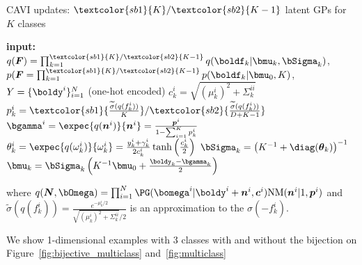 \begin{algorithm}[H]
    \caption{\ac{CAVI} updates: $\textcolor{sb1}{K}/\textcolor{sb2}{K - 1}$ latent \ac{GPs} for $K$ classes}
    \begin{algorithmic}
    \State \textbf{input:} $q(\boldsymbol{F}) = \prod_{k=1}^{\textcolor{sb1}{K}/\textcolor{sb2}{K - 1}} q(\boldf_k|\bmu_k, \bSigma_k)$, $p(\boldsymbol{F} = \prod_{k=1}^{\textcolor{sb1}{K}/\textcolor{sb2}{K - 1}} p(\boldf_k|\bmu_0, K)$, $Y=\{\boldy^i\}_{i=1}^N$ (one-hot encoded)
        \State $c^i_k = \sqrt{(\mu^i_k)^2 + \Sigma_k^{ii}}$
        \State $p^i_k = \textcolor{sb1}{\frac{\widetilde{\sigma}(q(f_k^i))}{K}}/\textcolor{sb2}{\frac{\widetilde{\sigma}(q(f_k^i))}{D + K - 1}}$
        \State $\bgamma^i = \expec{q(\boldsymbol{n}^i)}{\boldsymbol{n}^i} = \frac{\boldsymbol{p}^i}{1 - \sum_{i=1}^K p^i_k}$
        \State $\theta_k^i = \expec{q(\omega_k^i)}{\omega_k^i} = \frac{y_k^i + \gamma_k^i}{2c_k^i}\tanh\left(\frac{c_k^i}{2}\right)$
        \State $\bSigma_k = \left(K^{-1} + \diag(\boldsymbol{\theta}_k)\right)^{-1}$
        \State $\bmu_k = \bSigma_k\left(K^{-1}\bmu_0 + \frac{\boldy_k - \bgamma_k}{2}\right)$
    \EndWhile
    \end{algorithmic}
    where $q(\boldsymbol{N}, \bOmega) = \prod_{i=1}^N \PG(\bomega^i|\boldy^i + \boldsymbol{n}^i, \boldsymbol{c}^i)\mathrm{NM}(\boldsymbol{n}^i|1, \boldsymbol{p}^i)$ and $\widetilde{\sigma}(q(f_k^i)) = \frac{e^{-\mu_k^i/2}}{\sqrt{(\mu_k^i)^2 + \Sigma^{ii}_k} / 2}$ is an approximation to the $\sigma(-f^i_k)$.
    \label{alg:cavi_multiclass}
\end{algorithm}

We show 1-dimensional examples with 3 classes with and without the bijection on Figure~\ref{fig:bijective_multiclass} and~\ref{fig:multiclass}


